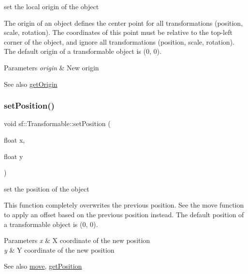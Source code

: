 set the local origin of the object 

The origin of an object defines the center point for all transformations (position, scale, rotation). The coordinates of this point must be relative to the top-\/left corner of the object, and ignore all transformations (position, scale, rotation). The default origin of a transformable object is (0, 0).


\begin{DoxyParams}{Parameters}
{\em origin} & New origin\\
\hline
\end{DoxyParams}
\begin{DoxySeeAlso}{See also}
\mbox{\hyperlink{classsf_1_1_transformable_a37ea3500afac234814a43ce809ef264e}{get\+Origin}} \begin{DoxyVerb}\end{DoxyVerb}
 
\end{DoxySeeAlso}
\mbox{\label{classsf_1_1_transformable_a4dbfb1a7c80688b0b4c477d706550208}} 
\subsubsection{\texorpdfstring{setPosition()}{setPosition()}\hspace{0.1cm}{\footnotesize\ttfamily [1/2]}}
{\footnotesize\ttfamily void sf\+::\+Transformable\+::set\+Position (\begin{DoxyParamCaption}\item[{float}]{x,  }\item[{float}]{y }\end{DoxyParamCaption})}



set the position of the object 

This function completely overwrites the previous position. See the move function to apply an offset based on the previous position instead. The default position of a transformable object is (0, 0).


\begin{DoxyParams}{Parameters}
{\em x} & X coordinate of the new position \\
\hline
{\em y} & Y coordinate of the new position\\
\hline
\end{DoxyParams}
\begin{DoxySeeAlso}{See also}
\mbox{\hyperlink{classsf_1_1_transformable_a86b461d6a941ad390c2ad8b6a4a20391}{move}}, \mbox{\hyperlink{classsf_1_1_transformable_a73f9739bc6e74db2cea154bc8e94ec46}{get\+Position}} \begin{DoxyVerb}\end{DoxyVerb}
 
\end{DoxySeeAlso}
\mbox{\label{classsf_1_1_transformable_af1a42209ce2b5d3f07b00f917bcd8015}} 
